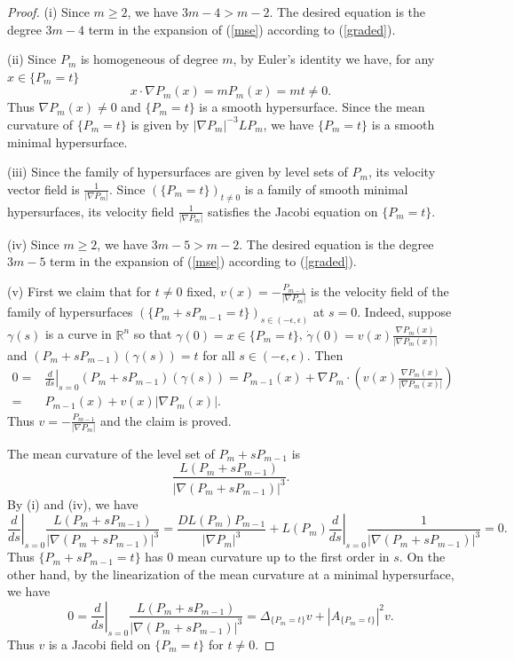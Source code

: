 \documentclass[pdflatex,sn-mathphys-num]{sn-jnl}%
\theoremstyle{thmstyleone}%
\theoremstyle{thmstyletwo}%
\theoremstyle{thmstylethree}%
\newcommand{\R}{\mathbb{R}}
\begin{document}
\begin{proof}
	(i) Since $m\ge 2$, we have $3m-4>m-2$. The desired equation is the degree $3m-4$ term in the expansion of (\ref{mse}) according to (\ref{graded}).
	
	
	(ii) Since $P_m$ is homogeneous of degree $m$, by Euler's identity we have, for any $x\in\{P_m=t\}$ \[x\cdot\nabla P_m(x)=mP_m(x)=mt\neq 0.\] Thus $\nabla P_m(x)\neq 0$ and $\{P_m=t\}$ is a smooth hypersurface. Since the mean curvature of $\{P_m=t\}$ is given by $|\nabla P_m|^{-3}L P_m$, we have $\{P_m=t\}$ is a smooth minimal hypersurface.
	
	
	(iii) Since the family of hypersurfaces are given by level sets of $P_m$, its velocity vector field is $\frac{1}{|\nabla P_m|}$. Since $(\{P_m=t\})_{t\neq0}$ is a family of smooth minimal hypersurfaces, its velocity field $\frac{1}{|\nabla P_m|}$ satisfies the Jacobi equation on $\{P_m=t\}$.
	
	(iv) Since $m\ge 2$, we have $3m-5>m-2$. The desired equation is the degree $3m-5$ term in the expansion of (\ref{mse}) according to (\ref{graded}).
	
	(v)
	First we claim that for $t\neq 0$ fixed, $v(x)=-\frac{P_{m-1}}{|\nabla P_m|}$ is the velocity field of the family of hypersurfaces $(\{P_m+sP_{m-1}=t\})_{s\in(-\epsilon,\epsilon)}$ at $s=0$. Indeed, suppose $\gamma(s)$ is a curve in $\R^n$ so that $\gamma(0)=x\in \{P_m=t\}$, $\dot \gamma(0)=v(x)\frac{\nabla P_m(x)}{|\nabla P_m(x)|}$ and $(P_m+sP_{m-1})(\gamma(s))=t$ for all $s\in(-\epsilon,\epsilon)$. Then 
	\[\begin{aligned}
		0=&\left.\frac{d}{ds}\right|_{s=0}(P_m+sP_{m-1})(\gamma(s))=P_{m-1}(x)+\nabla P_m\cdot \left(v(x)\frac{\nabla P_m(x)}{|\nabla P_m(x)|}\right)\\
		=&P_{m-1}(x)+v(x)|\nabla P_m(x)|.
	\end{aligned}\]
	Thus $v=-\frac{P_{m-1}}{|\nabla P_m|}$ and the claim is proved.
	
	The mean curvature of the level set of $P_m+sP_{m-1}$ is \[\frac{L(P_m+sP_{m-1})}{|\nabla (P_m+sP_{m-1})|^3}.\] By (i) and (iv), we have
	\[\left.\frac{d}{ds}\right|_{s=0}\frac{L(P_m+sP_{m-1})}{|\nabla (P_m+sP_{m-1})|^3}=\frac{DL(P_m)P_{m-1}}{|\nabla P_m|^3}+L(P_m)\left.\frac{d}{ds}\right|_{s=0}\frac{1}{|\nabla (P_m+sP_{m-1})|^3}=0.\] Thus $\{P_m+sP_{m-1}=t\}$ has 0 mean curvature up to the first order in $s$. On the other hand, by the linearization of the mean curvature at a minimal hypersurface, we have
	\[0=\left.\frac{d}{ds}\right|_{s=0}\frac{L(P_m+sP_{m-1})}{|\nabla (P_m+sP_{m-1})|^3}=\Delta_{\{P_m=t\}}v+|A_{\{P_m=t\}}|^2v.\] Thus $v$ is a Jacobi field on $\{P_m=t\}$ for $t\neq 0$.
\end{proof}
\end{document}
